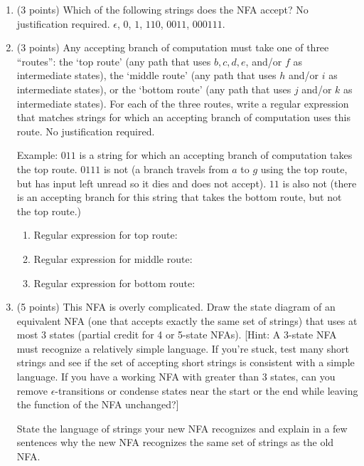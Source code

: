 \documentclass[letterpaper,11pt,twoside]{article}
\theoremstyle{plain}
\theoremstyle{definition}
\theoremstyle{remark}
\theoremstyle{restate}
\begin{document}
    \begin{enumerate}
        \item (3 points) Which of the following strings does the NFA accept? No justification required. $\epsilon$, $0$, $1$, $110$, $0011$, $000111$.
        
        \item (3 points) Any accepting branch of computation must take one of three ``routes'': the `top route' (any path that uses $b, c, d, e$, and/or $f$ as intermediate states), the `middle route' (any path that uses $h$ and/or $i$ as intermediate states), or the `bottom route' (any path that uses $j$ and/or $k$ as intermediate states). For each of the three routes, write a regular expression that matches strings for which an accepting branch of computation uses this route. No justification required.
        
        Example: $011$ is a string for which an accepting branch of computation takes the top route. $0111$ is not (a branch travels from $a$ to $g$ using the top route, but has input left unread so it dies and does not accept). $11$ is also not (there is an accepting branch for this string that takes the bottom route, but not the top route.)
        
        \begin{enumerate}
            \item Regular expression for top route: 
            \item Regular expression for middle route:
            \item Regular expression for bottom route: 
        \end{enumerate}
        \item (5 points) This NFA is overly complicated. Draw the state diagram of an equivalent NFA (one that accepts exactly the same set of strings) that uses at most 3 states (partial credit for 4 or 5-state NFAs). [Hint: A $3$-state NFA must recognize a relatively simple language. If you're stuck, test many short strings and see if the set of accepting short strings is consistent with a simple language. If you have a working NFA with greater than 3 states, can you remove $\epsilon$-transitions or condense states near the start or the end while leaving the function of the NFA unchanged?]
        
        State the language of strings your new NFA recognizes and explain in a few sentences why the new NFA recognizes the same set of strings as the old NFA.
    \end{enumerate}
    
\end{document}
